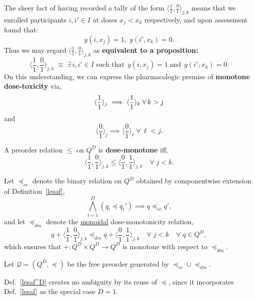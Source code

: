 \documentclass{article}
\begin{document}
\begin{nota}
  The sheer fact of having recorded a tally of the form $\langle\frac{1}{1},\frac{0}{1}\rangle_{j,k}$ means that we enrolled participants $i, i' \in I$ at doses $x_j < x_k$ respectively, and upon assessment found that:
  $$
  y(i,x_j) = 1, \; y(i',x_k) = 0.
  $$
  Thus we may regard $\langle\frac{1}{1},\frac{0}{1}\rangle_{j,k}$ as \textbf{equivalent to a proposition:}
  $$
  \langle\frac{1}{1},\frac{0}{1}\rangle_{j,k} \; \equiv \; \exists\, i, i' \in I \;\mbox{such that}\;\, y(i,x_j) = 1 \;\mbox{and}\;\, y(i',x_k) = 0.
  $$
  On this understanding, we can express the pharmacologic premise of \textbf{monotone dose-toxicity} via,
  $$
  \langle\frac{1}{1}\rangle_j \implies \langle\frac{1}{1}\rangle_k \;\forall\, k > j \\
  $$
  and
  $$
  \langle\frac{0}{1}\rangle_j \implies \langle\frac{0}{1}\rangle_\ell \;\forall\, \ell < j.
  $$
\end{nota}

\begin{defn}\label{domon}
  A preorder relation $\le$ on $Q^D$ is \textbf{dose-monotone} iff,
  $$
  \langle\frac{1}{1},\frac{0}{1}\rangle_{j,k} \le \langle\frac{0}{1},\frac{1}{1}\rangle_{j,k} \quad \forall \; j < k.
  $$
\end{defn}

\begin{nota}
  Let $\preceq_{ce}$ denote the binary relation on $Q^D$ obtained by componentwise extension of Definition~\ref{lesaf},
  $$
  \bigwedge_{i=1}^D (q_i \preceq q_i') \implies q \preceq_{ce} q',
  $$
  and let $\preceq_{dm}$ denote the \underline{monoidal} dose-monotonicity relation,
  \begin{equation}
  q + \langle\frac{1}{1},\frac{0}{1}\rangle_{j,k} \preceq_{dm} q + \langle\frac{0}{1},\frac{1}{1}\rangle_{j,k} \quad \forall\; j < k \quad \forall\; q \in Q^D, \label{xchg}
  \end{equation}
  which ensures that $+ : Q^D \times Q^D \rightarrow Q^D$ is monotone with respect to $\preceq_{dm}$.
\end{nota}

\begin{defn}\label{lesaf^D}
  Let $\mathcal{Q} = (Q^D,\preceq)$ be the free preorder generated by $\preceq_{ce} \cup \preceq_{dm}$.
\end{defn}

\begin{fact}
  Def.~\ref{lesaf^D} creates no ambiguity by its reuse of $\preceq$, since it incorporates Def.~\ref{lesaf} as the special case $D=1$.
\end{fact}
\end{document}
